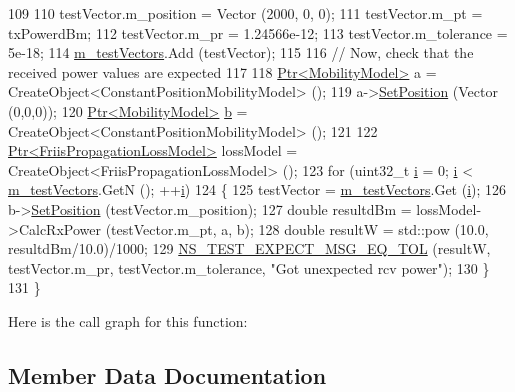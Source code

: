 \begin{DoxyCode}
109 
110   testVector.m\_position = Vector (2000, 0, 0);
111   testVector.m\_pt = txPowerdBm;
112   testVector.m\_pr = 1.24566e-12;
113   testVector.m\_tolerance = 5e-18;
114   \hyperlink{classFriisPropagationLossModelTestCase_a9fa3d0d4e10d07b03b540192c8453e00}{m\_testVectors}.Add (testVector);
115 
116   \textcolor{comment}{// Now, check that the received power values are expected}
117 
118   \hyperlink{classns3_1_1Ptr}{Ptr<MobilityModel>} a = CreateObject<ConstantPositionMobilityModel> (); 
119   a->\hyperlink{classns3_1_1MobilityModel_ac584b3d5a309709d2f13ed6ada1e7640}{SetPosition} (Vector (0,0,0));
120   \hyperlink{classns3_1_1Ptr}{Ptr<MobilityModel>} \hyperlink{buildings__pathloss_8m_a21ad0bd836b90d08f4cf640b4c298e7c}{b} = CreateObject<ConstantPositionMobilityModel> (); 
121 
122   \hyperlink{classns3_1_1Ptr}{Ptr<FriisPropagationLossModel>} lossModel = 
      CreateObject<FriisPropagationLossModel> (); 
123   \textcolor{keywordflow}{for} (uint32\_t \hyperlink{bernuolliDistribution_8m_a6f6ccfcf58b31cb6412107d9d5281426}{i} = 0; \hyperlink{bernuolliDistribution_8m_a6f6ccfcf58b31cb6412107d9d5281426}{i} < \hyperlink{classFriisPropagationLossModelTestCase_a9fa3d0d4e10d07b03b540192c8453e00}{m\_testVectors}.GetN (); ++\hyperlink{bernuolliDistribution_8m_a6f6ccfcf58b31cb6412107d9d5281426}{i})
124     \{
125       testVector = \hyperlink{classFriisPropagationLossModelTestCase_a9fa3d0d4e10d07b03b540192c8453e00}{m\_testVectors}.Get (\hyperlink{bernuolliDistribution_8m_a6f6ccfcf58b31cb6412107d9d5281426}{i});
126       b->\hyperlink{classns3_1_1MobilityModel_ac584b3d5a309709d2f13ed6ada1e7640}{SetPosition} (testVector.m\_position);
127       \textcolor{keywordtype}{double} resultdBm = lossModel->CalcRxPower (testVector.m\_pt, a, b);
128       \textcolor{keywordtype}{double} resultW = std::pow (10.0, resultdBm/10.0)/1000;
129       \hyperlink{group__testing_ga7927b376d1fed5e576c7a3d69d26e8a0}{NS\_TEST\_EXPECT\_MSG\_EQ\_TOL} (resultW, testVector.m\_pr, testVector.m\_tolerance,
       \textcolor{stringliteral}{"Got unexpected rcv power"});
130     \}
131 \}
\end{DoxyCode}


Here is the call graph for this function\+:




\subsection{Member Data Documentation}
